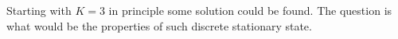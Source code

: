 \documentclass[a4paper,10pt]{article}
\begin{document}
Starting with $K=3$ %
in principle some solution could  be found.   The question is what would be the properties of such  discrete stationary state. 
%
\end{document}
